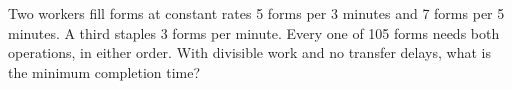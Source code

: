 Two workers fill forms at constant rates 5 forms per 3 minutes and 7 forms per 5 minutes. A third staples 3 forms per minute. Every one of 105 forms needs both operations, in either order. With divisible work and no transfer delays, what is the minimum completion time?
